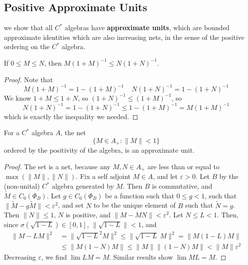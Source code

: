 \subsection{Positive Approximate Units}

we show that all $C^*$ algebras have {\bf approximate units}, which are bounded approximate identities which are also increasing nets, in the sense of the positive ordering on the $C^*$ algebra.

\begin{lemma}
    If $0 \leq M \leq N$, then $M(1 + M)^{-1} \leq N(1 + N)^{-1}$.
\end{lemma}
\begin{proof}
    Note that
    \[ M(1 + M)^{-1} = 1 - (1 + M)^{-1}\ \ \ \ \ N(1 + N)^{-1} = 1 - (1 + N)^{-1} \]
    We know $1 + M \leq 1 + N$, so $(1 + N)^{-1} \leq (1 + M)^{-1}$, so
    \[ N(1 + N)^{-1} = 1-(1 + N)^{-1} \leq 1-(1 + M)^{-1} = M(1 + M)^{-1} \]
    which is exactly the inequality we needed.
\end{proof}

\begin{prop}
    For a $C^*$ algebra $A$, the net
    \[ \{ M \in A_+ : \| M \| < 1 \} \]
    ordered by the positivity of the algebra, is an approximate unit.
\end{prop}
\begin{proof}
    The set is a net, because any $M,N \in A_+$ are less than or equal to $\max(\|M\|,\|N\|)$. Fix a self adjoint $M \in A$, and let $\varepsilon > 0$. Let $B$ by the (non-unital) $C^*$ algebra generated by $M$. Then $B$ is commutative, and $\widetilde{M} \in C_0(\Phi_B)$. Let $g \in C_0(\Phi_B)$ be a function such that $0 \leq g < 1$, such that $\| \widetilde{M} - g \widetilde{M} \| < \varepsilon^2$, and set $N$ to be the unique element of $B$ such that $\widetilde{N} = g$. Then $\| N \| \leq 1$, $N$ is positive, and $\| M - MN \| < \varepsilon^2$. Let $N \leq L < 1$. Then, since $\sigma(\sqrt{1 - L}) \in [0,1]$, $\| \sqrt{1 - L} \| < 1$, and
    \begin{align*}
        \| M - LM \|^2 &= \| \sqrt{1 - L}^2 M \|^2 \leq \| \sqrt{1 - L}\ M \|^2 = \| M(1 - L)M \|\\
        &\leq \| M(1 - N)M \| \leq \| M \| \| (1 - N)M \| < \| M \| \varepsilon^2
    \end{align*}
    Decreasing $\varepsilon$, we find $\lim LM = M$. Similar results show $\lim ML = M$.
\end{proof}

